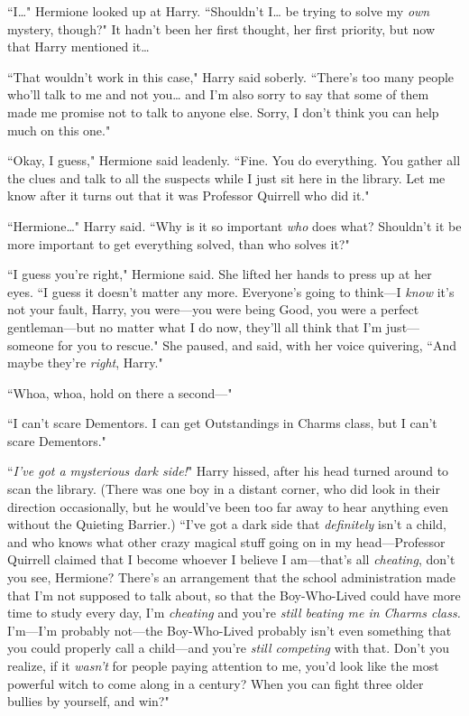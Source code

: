 ``I{\ldots}" Hermione looked up at Harry. ``Shouldn't I{\ldots} be trying to solve my \emph{own} mystery, though?" It hadn't been her first thought, her first priority, but now that Harry mentioned it{\ldots}

``That wouldn't work in this case," Harry said soberly. ``There's too many people who'll talk to me and not you{\ldots} and I'm also sorry to say that some of them made me promise not to talk to anyone else. Sorry, I don't think you can help much on this one."

``Okay, I guess," Hermione said leadenly. ``Fine. You do everything. You gather all the clues and talk to all the suspects while I just sit here in the library. Let me know after it turns out that it was Professor Quirrell who did it."

``Hermione{\ldots}" Harry said. ``Why is it so important \emph{who} does what? Shouldn't it be more important to get everything solved, than who solves it?"

``I guess you're right," Hermione said. She lifted her hands to press up at her eyes. ``I guess it doesn't matter any more. Everyone's going to think—I \emph{know} it's not your fault, Harry, you were—you were being Good, you were a perfect gentleman—but no matter what I do now, they'll all think that I'm just—someone for you to rescue." She paused, and said, with her voice quivering, ``And maybe they're \emph{right}, Harry."

``Whoa, whoa, hold on there a second—"

``I can't scare Dementors. I can get Outstandings in Charms class, but I can't scare Dementors."

``\emph{I've got a mysterious dark side!}" Harry hissed, after his head turned around to scan the library. (There was one boy in a distant corner, who did look in their direction occasionally, but he would've been too far away to hear anything even without the Quieting Barrier.) ``I've got a dark side that \emph{definitely} isn't a child, and who knows what other crazy magical stuff going on in my head—Professor Quirrell claimed that I become whoever I believe I am—that's all \emph{cheating}, don't you see, Hermione? There's an arrangement that the school administration made that I'm not supposed to talk about, so that the Boy-Who-Lived could have more time to study every day, I'm \emph{cheating} and you're \emph{still beating me in Charms class.} I'm—I'm probably not—the Boy-Who-Lived probably isn't even something that you could properly call a child—and you're \emph{still competing} with that. Don't you realize, if it \emph{wasn't} for people paying attention to me, you'd look like the most powerful witch to come along in a century? When you can fight three older bullies by yourself, and win?"

